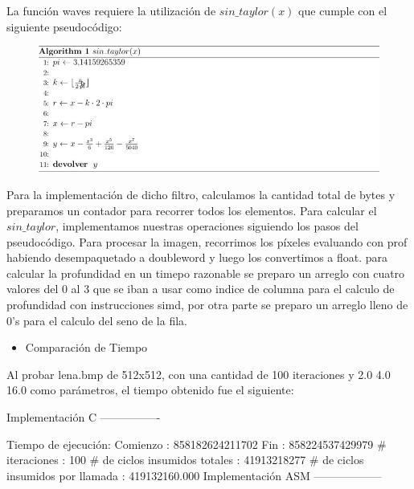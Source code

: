 \documentclass[10pt, a4paper]{article}
\begin{document}
\begin{itemize}
La función waves requiere la utilización de $sin\_taylor(x)$ que cumple con el siguiente pseudocódigo:
\begin{figure}[H] %
\begin{center}
\includegraphics[width=400pt]{./algoritmo_waves.jpg}
\end{center}
\end{figure}
Para la implementación de dicho filtro, calculamos la cantidad total de bytes y preparamos un contador para recorrer todos los elementos. Para calcular el $sin\_taylor$, implementamos nuestras operaciones siguiendo los pasos del pseudocódigo.\newline
Para procesar la imagen, recorrimos los píxeles evaluando con prof habiendo desempaquetado a doubleword y luego los convertimos a float.
para calcular la profundidad en un timepo razonable se preparo un arreglo con cuatro valores del 0 al 3 que se iban a usar como indice de columna para el calculo de profundidad con instrucciones simd, por otra parte se preparo un arreglo lleno de 0's para el calculo del seno de la fila.
\begin{itemize}
\item{Comparación de Tiempo}
\end{itemize}
Al probar lena.bmp de 512x512, con una cantidad de 100 iteraciones y 2.0 4.0 16.0 como parámetros, el tiempo obtenido fue el siguiente:\newline

Implementación C\newline
----------------

Tiempo de ejecución:\newline
  Comienzo                          : 858182624211702\newline
  Fin                               : 858224537429979\newline
  \# iteraciones                     : 100\newline
  \# de ciclos insumidos totales     : 41913218277\newline
  \# de ciclos insumidos por llamada : 419132160.000\newline
\newline
Implementación ASM\newline
------------------


\end{itemize}
\end{document}
